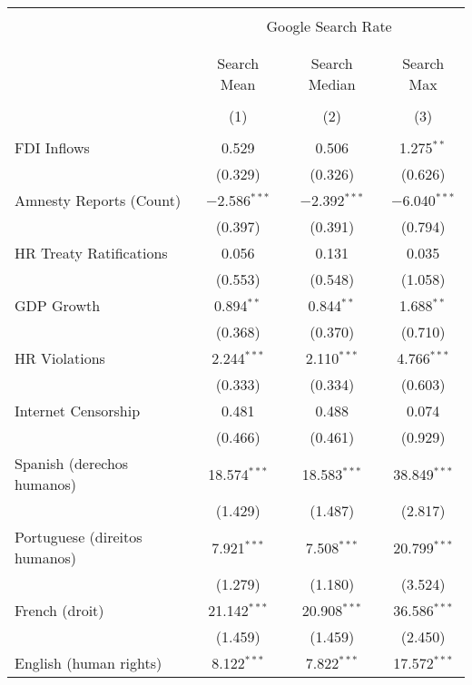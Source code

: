 
\begin{table}[!htbp] \centering 
  \caption{} 
  \label{} 
\begin{tabular}{@{\extracolsep{5pt}}lccc} 
\\[-1.8ex]\hline 
\hline \\[-1.8ex] 
 & \multicolumn{3}{c}{Google Search Rate} \\ 
\cline{2-4} 
\\[-1.8ex] & \multicolumn{3}{c}{ } \\ 
 & Search Mean & Search Median & Search Max \\ 
\\[-1.8ex] & (1) & (2) & (3)\\ 
\hline \\[-1.8ex] 
 FDI Inflows & 0.529 & 0.506 & 1.275$^{**}$ \\ 
  & (0.329) & (0.326) & (0.626) \\ 
  Amnesty Reports (Count) & $-$2.586$^{***}$ & $-$2.392$^{***}$ & $-$6.040$^{***}$ \\ 
  & (0.397) & (0.391) & (0.794) \\ 
  HR Treaty Ratifications & 0.056 & 0.131 & 0.035 \\ 
  & (0.553) & (0.548) & (1.058) \\ 
  GDP Growth & 0.894$^{**}$ & 0.844$^{**}$ & 1.688$^{**}$ \\ 
  & (0.368) & (0.370) & (0.710) \\ 
  HR Violations & 2.244$^{***}$ & 2.110$^{***}$ & 4.766$^{***}$ \\ 
  & (0.333) & (0.334) & (0.603) \\ 
  Internet Censorship & 0.481 & 0.488 & 0.074 \\ 
  & (0.466) & (0.461) & (0.929) \\ 
  Spanish (derechos humanos) & 18.574$^{***}$ & 18.583$^{***}$ & 38.849$^{***}$ \\ 
  & (1.429) & (1.487) & (2.817) \\ 
  Portuguese (direitos humanos) & 7.921$^{***}$ & 7.508$^{***}$ & 20.799$^{***}$ \\ 
  & (1.279) & (1.180) & (3.524) \\ 
  French (droit) & 21.142$^{***}$ & 20.908$^{***}$ & 36.586$^{***}$ \\ 
  & (1.459) & (1.459) & (2.450) \\ 
  English (human rights) & 8.122$^{***}$ & 7.822$^{***}$ & 17.572$^{***}$ \\ 

\end{tabular}
\end{table}
